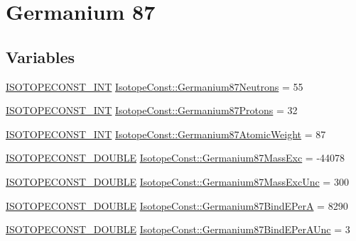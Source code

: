 \hypertarget{group___isotope_const-_germanium-_ge87}{}\section{Germanium 87}
\label{group___isotope_const-_germanium-_ge87}
\subsection*{Variables}
\begin{DoxyCompactItemize}
\item 
\mbox{\hyperlink{group___isotope_const-_macros_ga5f18360b3e99483a35c32d789e62621c}{I\+S\+O\+T\+O\+P\+E\+C\+O\+N\+S\+T\+\_\+\+I\+NT}} \mbox{\hyperlink{group___isotope_const-_germanium-_ge87_gad1f7068c0b551ceb40b9d096729e6705}{Isotope\+Const\+::\+Germanium87\+Neutrons}} = 55
\item 
\mbox{\hyperlink{group___isotope_const-_macros_ga5f18360b3e99483a35c32d789e62621c}{I\+S\+O\+T\+O\+P\+E\+C\+O\+N\+S\+T\+\_\+\+I\+NT}} \mbox{\hyperlink{group___isotope_const-_germanium-_ge87_gab9e25917a67a855423d788367a3442b4}{Isotope\+Const\+::\+Germanium87\+Protons}} = 32
\item 
\mbox{\hyperlink{group___isotope_const-_macros_ga5f18360b3e99483a35c32d789e62621c}{I\+S\+O\+T\+O\+P\+E\+C\+O\+N\+S\+T\+\_\+\+I\+NT}} \mbox{\hyperlink{group___isotope_const-_germanium-_ge87_gadecbfae820f66e68193ee83389fe31a8}{Isotope\+Const\+::\+Germanium87\+Atomic\+Weight}} = 87
\item 
\mbox{\hyperlink{group___isotope_const-_macros_ga8f45a7272ce02c0b4c65c44636ed719a}{I\+S\+O\+T\+O\+P\+E\+C\+O\+N\+S\+T\+\_\+\+D\+O\+U\+B\+LE}} \mbox{\hyperlink{group___isotope_const-_germanium-_ge87_ga77d270ac65638a5a9daf8b2e4d1383ce}{Isotope\+Const\+::\+Germanium87\+Mass\+Exc}} = -\/44078
\item 
\mbox{\hyperlink{group___isotope_const-_macros_ga8f45a7272ce02c0b4c65c44636ed719a}{I\+S\+O\+T\+O\+P\+E\+C\+O\+N\+S\+T\+\_\+\+D\+O\+U\+B\+LE}} \mbox{\hyperlink{group___isotope_const-_germanium-_ge87_ga9c38c835036b7a9fcbe1e52a093bcd56}{Isotope\+Const\+::\+Germanium87\+Mass\+Exc\+Unc}} = 300
\item 
\mbox{\hyperlink{group___isotope_const-_macros_ga8f45a7272ce02c0b4c65c44636ed719a}{I\+S\+O\+T\+O\+P\+E\+C\+O\+N\+S\+T\+\_\+\+D\+O\+U\+B\+LE}} \mbox{\hyperlink{group___isotope_const-_germanium-_ge87_ga19849998dacbc97cd3835b031c104262}{Isotope\+Const\+::\+Germanium87\+Bind\+E\+PerA}} = 8290
\item 
\mbox{\hyperlink{group___isotope_const-_macros_ga8f45a7272ce02c0b4c65c44636ed719a}{I\+S\+O\+T\+O\+P\+E\+C\+O\+N\+S\+T\+\_\+\+D\+O\+U\+B\+LE}} \mbox{\hyperlink{group___isotope_const-_germanium-_ge87_ga4f84bc8ff5f63cef80b4dd3301b40d91}{Isotope\+Const\+::\+Germanium87\+Bind\+E\+Per\+A\+Unc}} = 3

\end{DoxyCompactItemize}
